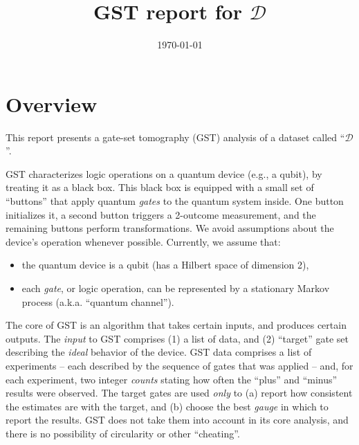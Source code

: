 \documentclass{article}[11pt]
\begin{document}
\title{GST report for $\mathcal{D}$}
\date{\vspace{-1cm}\today}

\begingroup
\let\center\flushleft
\let\endcenter\endflushleft
\maketitle
\endgroup

\section{Overview}
This report presents a gate-set tomography (GST) analysis of a dataset called ``$\mathcal{D}$''.  

GST characterizes logic operations on a quantum device (e.g., a qubit), by treating it as a black box.  This black box is equipped with a small set of ``buttons'' that apply quantum \emph{gates} to the quantum system inside.  One button initializes it, a second button triggers a 2-outcome measurement, and the remaining buttons perform transformations.  We avoid assumptions about the device's operation whenever possible.  Currently, we assume that:
\begin{itemize}
\item the quantum device is a qubit (has a Hilbert space of dimension 2),
\item each \emph{gate}, or logic operation, can be represented by a stationary Markov process (a.k.a. ``quantum channel'').
\end{itemize}
The core of GST is an algorithm that takes certain inputs, and produces certain outputs.  The \emph{input} to GST comprises (1) a list of data, and (2) ``target'' gate set describing the \emph{ideal} behavior of the device.  GST data comprises a list of experiments -- each described by the sequence of gates that was applied -- and, for each experiment, two integer \emph{counts} stating how often the ``plus'' and ``minus'' results were observed.  The target gates are used \emph{only} to (a) report how consistent the estimates are with the target, and (b) choose the best \emph{gauge} in which to report the results.  GST does not take them into account in its core analysis, and there is no possibility of circularity or other ``cheating''.
\end{document}
